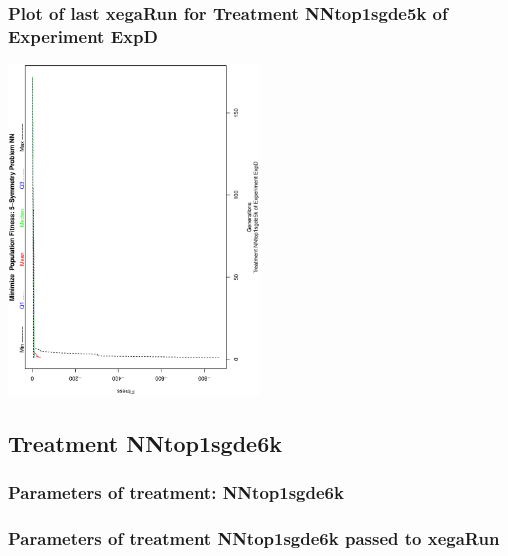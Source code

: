 \documentclass[18pt,c]{beamer}
\makeatletter
\def\beamer@writeslidentry@miniframesoff{%
  \expandafter\beamer@ifempty\expandafter{\beamer@framestartpage}{}%
  {%
   \clearpage\beamer@notesactions%
  }
}
\newcommand*{\miniframesoff}{\let\beamer@writeslidentry=\beamer@writeslidentry@miniframesoff}
\makeatother
\begin{document}
 \begin{frame}
 \frametitle{ Plot of last xegaRun for Treatment NNtop1sgde5k of Experiment ExpD }
 \begin{center}
\includegraphics[width=0.5\textwidth, angle=-90]
{ExpDPlotPopStatsFigure008.eps}
 \end{center}
 \label{report/ExpDPlotPopStatsFigure008.eps}  
 \end{frame}

\miniframesoff
\subsection{Treatment NNtop1sgde6k}

 \begin{frame}
 \fontsize{8pt}{9pt}\selectfont
 \frametitle{  Parameters of treatment: NNtop1sgde6k 
 }

 \label{ExpDtParmTable027.tex}  
 \end{frame}


 \begin{frame}
 \fontsize{8pt}{9pt}\selectfont
 \frametitle{  Parameters of treatment NNtop1sgde6k passed to xegaRun
 }

 \label{ExpDtParmTable028.tex}  
 \end{frame}
\end{document}
